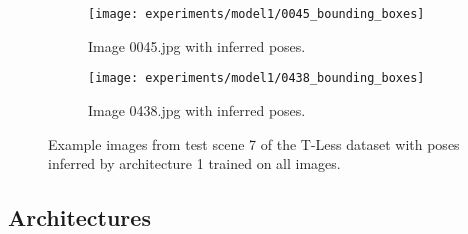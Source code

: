 \begin{figure}[!tbp]
	\begin{subfigure}[t]{0.47\textwidth}
		\centering
    	\texttt{[image: experiments/model1/0045\_bounding\_boxes]}
    	\caption{Image 0045.jpg with inferred poses.}
	\end{subfigure} 
	\hfill
	\begin{subfigure}[t]{0.47\textwidth}
		\centering
    	\texttt{[image: experiments/model1/0438\_bounding\_boxes]}
    	\caption{Image 0438.jpg with inferred poses.}
	\end{subfigure} 
	\caption{Example images from test scene 7 of the T-Less dataset with poses inferred by architecture 1 trained on all images.}
	\label{fig:architecture_experiments_example_frames}
\end{figure} 

\subsection{Architectures} \label{subsection:architectures}

